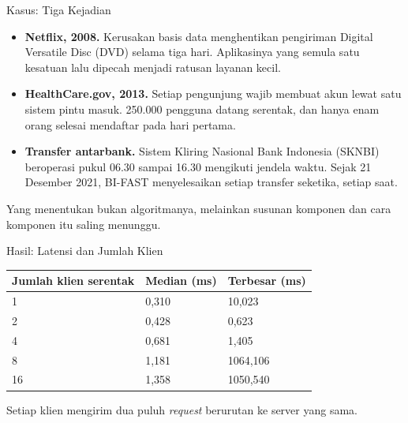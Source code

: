 \documentclass[aspectratio=169, table, 12pt]{beamer}
\begin{document}
\begin{frame}{{\Large Kasus: Tiga Kejadian}}
  \vspace{6pt}
  \begin{itemize}\small
    \item \textbf{Netflix, 2008.} Kerusakan basis data menghentikan pengiriman
          Digital Versatile Disc (DVD) selama tiga hari. Aplikasinya yang
          semula satu kesatuan lalu dipecah menjadi ratusan layanan kecil.
    \item \textbf{HealthCare.gov, 2013.} Setiap pengunjung wajib membuat akun
          lewat satu sistem pintu masuk. 250.000 pengguna datang serentak, dan
          hanya enam orang selesai mendaftar pada hari pertama.
    \item \textbf{Transfer antarbank.} Sistem Kliring Nasional Bank Indonesia
          (SKNBI) beroperasi pukul 06.30 sampai 16.30 mengikuti jendela waktu.
          Sejak 21 Desember 2021, BI-FAST menyelesaikan setiap transfer
          seketika, setiap saat.
  \end{itemize}

  \vspace{6pt}
  {\small Yang menentukan bukan algoritmanya, melainkan susunan komponen dan
  cara komponen itu saling menunggu.}
\end{frame}

\begin{frame}{{\Large Hasil: Latensi dan Jumlah Klien}}
  \vspace{6pt}
  \centering
  \small
  \begin{tabularx}{0.8\textwidth}{|X|l|l|}
    \hline
    \textbf{Jumlah klien serentak} & \textbf{Median (ms)} & \textbf{Terbesar (ms)} \\
    \hline
    1 & 0,310 & 10,023 \\
    \hline
    2 & 0,428 & 0,623 \\
    \hline
    4 & 0,681 & 1,405 \\
    \hline
    8 & 1,181 & 1064,106 \\
    \hline
    16 & 1,358 & 1050,540 \\
    \hline
  \end{tabularx}

  \vspace{6pt}
  {\small Setiap klien mengirim dua puluh \textit{request} berurutan ke server
  yang sama.}
\end{frame}
\end{document}
